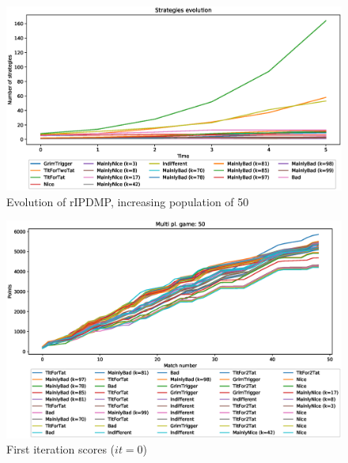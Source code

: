 \documentclass[journal,a4paper,10pt,twoside]{IEEEtran} %
\begin{document}
\begin{figure}[!ht]
    \centering
    \includegraphics[width=1\columnwidth]{../img/ripdmp-incr/ripdmp-evolution-increasing-pop-50}
    \caption{Evolution of rIPDMP, increasing population of 50}
    \label{fig:incrR}
\end{figure}

\begin{figure}[!ht]
    \centering
    \includegraphics[width=1\columnwidth]{../img/ripdmp-incr/ripdmp-scores-increasing-pop-50-r0}
    \caption{First iteration scores ($it=0$)}
    \label{fig:incrFI}
\end{figure}
\end{document}
